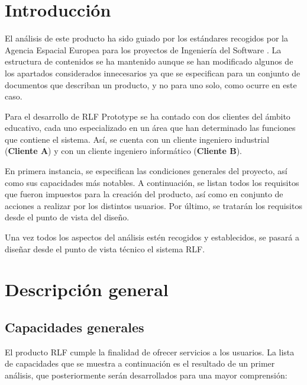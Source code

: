 

\section{Introducción}
\label{sec:introduccion}
El análisis de este producto ha sido guiado por los estándares 
recogidos por la Agencia Espacial Europea para los proyectos de 
Ingeniería del Software \cite{esa}. La estructura de contenidos se ha 
mantenido aunque se han modificado algunos de los apartados 
considerados innecesarios ya que se especifican para un conjunto de 
documentos que describan un producto, y no para uno solo, como ocurre 
en este caso.

Para el desarrollo de RLF Prototype se ha contado con dos clientes del ámbito 
educativo, cada uno especializado en un área que han determinado las 
funciones que contiene el sistema. Así, se cuenta con un cliente 
ingeniero industrial (\textbf{Cliente A}) y con un cliente ingeniero 
informático (\textbf{Cliente B}).

En primera instancia, se especifican las condiciones generales del 
proyecto, así como sus capacidades más notables. A continuación, se 
listan todos los requisitos que fueron impuestos para la creación del 
producto, así como en conjunto de acciones a realizar por los 
distintos usuarios. Por último, se tratarán los requisitos desde el 
punto de vista del diseño.

Una vez todos los aspectos del análisis estén recogidos y 
establecidos, se pasará a diseñar desde el punto de vista técnico el 
sistema RLF.

\section{Descripción general}
\subsection{Capacidades generales}
El producto RLF cumple la finalidad de ofrecer servicios a los 
usuarios. La lista de capacidades que se muestra a continuación es el 
resultado de un primer análisis, que posteriormente serán 
desarrollados para una mayor comprensión:

